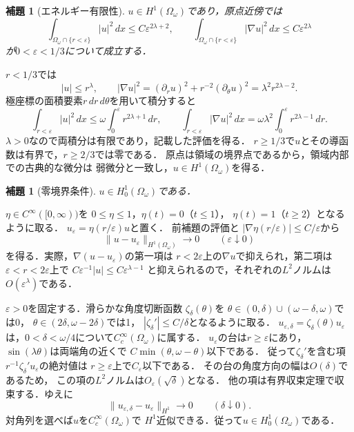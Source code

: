\documentclass[a5paper,10pt,onecolumn]{jsarticle}
\makeatletter
\theoremstyle{mathnotetheorem}
\newtheorem{lemma}[theorem]{補題}
\renewcommand{\proofname}{証明}
\renewenvironment{proof}[1][\proofname]{%
  \par\pushQED{\qed}\normalfont\topsep4\p@\@plus2\p@\relax
  \trivlist\item[\hskip\labelsep\bfseries #1]\ignorespaces
}{\popQED\endtrivlist\@endpefalse}
\makeatother
\begin{document}
\begin{lemma}[エネルギー有限性]\label{corner:lem:H1}
$u\in H^1(\Omega_\omega)$であり，原点近傍では
\[
 \int_{\Omega_\omega\cap\{r<\varepsilon\}}|u|^2\,dx
      \le C\varepsilon^{2\lambda+2},\qquad
 \int_{\Omega_\omega\cap\{r<\varepsilon\}}|\nabla u|^2\,dx
      \le C\varepsilon^{2\lambda}
\]
が$0<\varepsilon<1/3$について成立する．
\end{lemma}
\begin{proof}
$r<1/3$では
\[
 |u|\le r^\lambda,\qquad
 |\nabla u|^2=(\partial_r u)^2+r^{-2}(\partial_\theta u)^2
             =\lambda^2r^{2\lambda-2}.
\]
極座標の面積要素$r\,dr\,d\theta$を用いて積分すると
\[
 \int_{r<\varepsilon}|u|^2\,dx
   \le\omega\int_0^\varepsilon r^{2\lambda+1}\,dr,
 \qquad
 \int_{r<\varepsilon}|\nabla u|^2\,dx
   =\omega\lambda^2\int_0^\varepsilon r^{2\lambda-1}\,dr.
\]
$\lambda>0$なので両積分は有限であり，記載した評価を得る．
$r\ge1/3$で$u$とその導函数は有界で，$r\ge2/3$では零である．
原点は領域の境界点であるから，領域内部での古典的な微分は
弱微分と一致し，$u\in H^1(\Omega_\omega)$を得る．
\end{proof}

\begin{lemma}[零境界条件]\label{corner:lem:H0}
$u\in H_0^1(\Omega_\omega)$である．
\end{lemma}
\begin{proof}
$\eta\in C^\infty([0,\infty))$を
$0\le\eta\le1$，$\eta(t)=0$（$t\le1$），
$\eta(t)=1$（$t\ge2$）となるように取る．
$u_\varepsilon=\eta(r/\varepsilon)u$と置く．
前補題の評価と
$|\nabla\eta(r/\varepsilon)|\le C/\varepsilon$から
\[
 \|u-u_\varepsilon\|_{H^1(\Omega_\omega)}
       \longrightarrow0\qquad(\varepsilon\downarrow0)
\]
を得る．実際，$\nabla(u-u_\varepsilon)$の第一項は
$r<2\varepsilon$上の$\nabla u$で抑えられ，第二項は
$\varepsilon<r<2\varepsilon$上で
$C\varepsilon^{-1}|u|\le C\varepsilon^{\lambda-1}$
と抑えられるので，それぞれの$L^2$ノルムは
$O(\varepsilon^\lambda)$である．

$\varepsilon>0$を固定する．滑らかな角度切断函数
$\zeta_\delta(\theta)$を
$\theta\in(0,\delta)\cup(\omega-\delta,\omega)$では0，
$\theta\in(2\delta,\omega-2\delta)$では1，
$|\zeta_\delta'|\le C/\delta$となるように取る．
$u_{\varepsilon,\delta}=\zeta_\delta(\theta)u_\varepsilon$
は，$0<\delta<\omega/4$について$C_c^\infty(\Omega_\omega)$に属する．
$u_\varepsilon$の台は$r\ge\varepsilon$にあり，
$\sin(\lambda\theta)$は両端角の近くで
$C\min(\theta,\omega-\theta)$以下である．
従って$\zeta_\delta'$を含む項
$r^{-1}\zeta_\delta' u_\varepsilon$の絶対値は
$r\ge\varepsilon$上で$C_\varepsilon$以下である．
その台の角度方向の幅は$O(\delta)$であるため，
この項の$L^2$ノルムは$O_\varepsilon(\sqrt\delta)$となる．
他の項は有界収束定理で収束する．ゆえに
\[
 \|u_{\varepsilon,\delta}-u_\varepsilon\|_{H^1}
   \longrightarrow0\qquad(\delta\downarrow0).
\]
対角列を選べば$u$を$C_c^\infty(\Omega_\omega)$で
$H^1$近似できる．従って$u\in H_0^1(\Omega_\omega)$である．
\end{proof}
\end{document}

